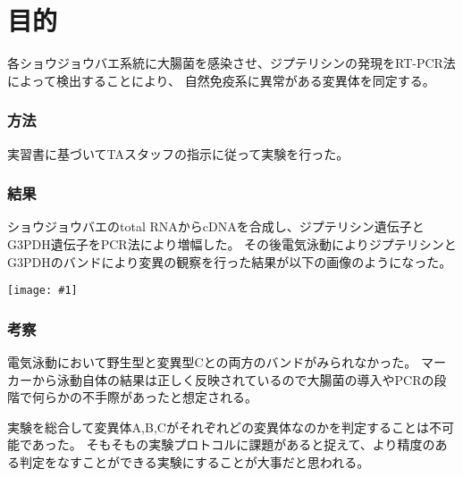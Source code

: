 \documentclass[a4paper,papersize,dvipdfmx]{jsarticle}
\newcommand{\pict}[2]{\begin{center} \texttt{[image: \#1]} \end{center}}   %
\begin{document}
\part*{目的}
各ショウジョウバエ系統に大腸菌を感染させ、ジプテリシンの発現をRT-PCR法によって検出することにより、
自然免疫系に異常がある変異体を同定する。

\section*{方法}
実習書に基づいてTAスタッフの指示に従って実験を行った。
\section*{結果}
ショウジョウバエのtotal RNAからcDNAを合成し、ジプテリシン遺伝子とG3PDH遺伝子をPCR法により増幅した。
その後電気泳動によりジプテリシンとG3PDHのバンドにより変異の観察を行った結果が以下の画像のようになった。
\pict{edo.jpg}{8}

\section*{考察}
電気泳動において野生型と変異型Cとの両方のバンドがみられなかった。
マーカーから泳動自体の結果は正しく反映されているので大腸菌の導入やPCRの段階で何らかの不手際があったと想定される。

実験を総合して変異体A,B,Cがそれぞれどの変異体なのかを判定することは不可能であった。
そもそもの実験プロトコルに課題があると捉えて、より精度のある判定をなすことができる実験にすることが大事だと思われる。
\end{document}
